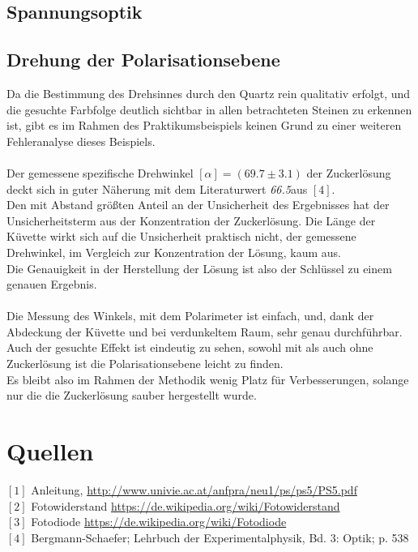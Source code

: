 \documentclass[12pt,a4paper]{article}
\begin{document}
\begin{multicols}{2}
\subsection{Spannungsoptik}




\subsection{Drehung der Polarisationsebene}

Da die Bestimmung des Drehsinnes durch den Quartz rein qualitativ erfolgt, und die gesuchte Farbfolge deutlich sichtbar in allen betrachteten Steinen zu erkennen ist, gibt es im Rahmen des Praktikumsbeispiels keinen Grund zu einer weiteren Fehleranalyse dieses Beispiels.\\
\\
Der gemessene spezifische Drehwinkel $[\alpha] = (69.7 \pm 3.1)$ der Zuckerlösung deckt sich in guter Näherung mit dem Literaturwert \emph{66.5}aus $[4]$.\\
Den mit Abstand größten Anteil an der Unsicherheit des Ergebnisses hat der Unsicherheitsterm aus der Konzentration der Zuckerlösung. Die Länge der Küvette wirkt sich auf die Unsicherheit praktisch nicht, der gemessene Drehwinkel, im Vergleich zur Konzentration der Lösung, kaum aus.\\
Die Genauigkeit in der Herstellung der Lösung ist also der Schlüssel zu einem genauen Ergebnis.\\
\\
Die Messung des Winkels, mit dem Polarimeter ist einfach, und, dank der Abdeckung der Küvette und bei verdunkeltem Raum, sehr genau durchführbar. Auch der gesuchte Effekt ist eindeutig zu sehen, sowohl mit als auch ohne Zuckerlösung ist die Polarisationsebene leicht zu finden.\\
Es bleibt also im Rahmen der Methodik wenig Platz für Verbesserungen, solange nur die die Zuckerlösung sauber hergestellt wurde.


\section{Quellen}
$[1]$ Anleitung, \url{http://www.univie.ac.at/anfpra/neu1/ps/ps5/PS5.pdf}\\
$[2]$ Fotowiderstand \url{https://de.wikipedia.org/wiki/Fotowiderstand}\\
$[3]$ Fotodiode \url{https://de.wikipedia.org/wiki/Fotodiode}\\
$[4]$ Bergmann-Schaefer; Lehrbuch der Experimentalphysik, Bd. 3: Optik; p. 538\\
\end{multicols}
\end{document}
